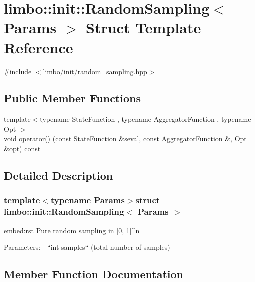 \hypertarget{structlimbo_1_1init_1_1_random_sampling}{}\section{limbo\+:\+:init\+:\+:Random\+Sampling$<$ Params $>$ Struct Template Reference}
\label{structlimbo_1_1init_1_1_random_sampling}


{\ttfamily \#include $<$limbo/init/random\+\_\+sampling.\+hpp$>$}

\subsection*{Public Member Functions}
\begin{DoxyCompactItemize}
\item 
{\footnotesize template$<$typename State\+Function , typename Aggregator\+Function , typename Opt $>$ }\\void \hyperlink{structlimbo_1_1init_1_1_random_sampling_a4173b31aa6453a68f43aa7d24fbd0ca9}{operator()} (const State\+Function \&seval, const Aggregator\+Function \&, Opt \&opt) const 
\end{DoxyCompactItemize}


\subsection{Detailed Description}
\subsubsection*{template$<$typename Params$>$struct limbo\+::init\+::\+Random\+Sampling$<$ Params $>$}

\begin{DoxyVerb}embed:rst
Pure random sampling in [0, 1]^n

Parameters:
  - ``int samples`` (total number of samples)
\end{DoxyVerb}
 

\subsection{Member Function Documentation}
\hypertarget{structlimbo_1_1init_1_1_random_sampling_a4173b31aa6453a68f43aa7d24fbd0ca9}{}
